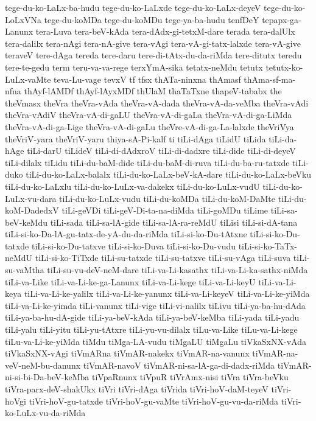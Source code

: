 {tege-du-ko-LaLx-ba-hudu
tege-du-ko-LaLxde
tege-du-ko-LaLx-deyeV
tege-du-ko-LoLxVNa
tege-du-koMDa
tege-du-koMDu
tege-ya-ba-hudu
tenfDeY
tepapx-ga-Lanunx
tera-Luva
tera-beV-kAda
tera-dAdx-gi-tetxM-dare
terada
tera-dalUlx
tera-dalilx
tera-nAgi
tera-nA-give
tera-vAgi
tera-vA-gi-tatx-lalxde
tera-vA-give
teraveV
tere-dAga
tereda
tere-daru
tere-di-tAtx-du-da-riMda
tere-ditutx
teredu
tere-te-gedu
term
teru-va-va-rege
terxYmA-sika
tetatx-neMdu
tetutx
tetutx-ko-LuLx-vaMte
teva-Lu-vage
tevxV
tf
tfsx
thATa-ninxna
thAmasf
thAma-sf-ma-nfna
thAyf-lAMDf
thAyf-lAyxMDf
thUlaM
thaTaTxne
thapeV-tababx
the
theVmasx
theVra
theVra-vAda
theVra-vA-dada
theVra-vA-da-veMba
theVra-vAdi
theVra-vAdiV
theVra-vA-di-gaLU
theVra-vA-di-gaLa
theVra-vA-di-ga-LiMda
theVra-vA-di-ga-Lige
theVra-vA-di-gaLu
theVre-vA-di-ga-La-lalxde
theVriVya
theVriV-yara
theVriV-yaru
thiya-sA-Pi-kalf
ti
tiLi-dAga
tiLidU
tiLida
tiLi-da-hAge
tiLi-darU
tiLideV
tiLi-di-dAdxroV
tiLi-di-dadxre
tiLi-dide
tiLi-di-deyeV
tiLi-dilalx
tiLidu
tiLi-du-baM-dide
tiLi-du-baM-di-ruva
tiLi-du-ba-ru-tatxde
tiLi-duko
tiLi-du-ko-LaLx-balalx
tiLi-du-ko-LaLx-beV-kA-dare
tiLi-du-ko-LaLx-beVku
tiLi-du-ko-LaLxlu
tiLi-du-ko-LuLx-va-dakekx
tiLi-du-ko-LuLx-vudU
tiLi-du-ko-LuLx-vu-dara
tiLi-du-ko-LuLx-vudu
tiLi-du-koMDa
tiLi-du-koM-DaMte
tiLi-du-koM-DadedxV
tiLi-geVDi
tiLi-geV-Di-ta-na-diMda
tiLi-goMDu
tiLime
tiLi-sa-beV-keMdu
tiLi-sada
tiLi-sa-lA-gide
tiLi-sa-lA-ra-reMdU
tiLisi
tiLi-si-dA-tana
tiLi-si-ko-Da-lA-gu-tatx-de-yA-du-da-riMda
tiLi-si-ko-Du-tAtxne
tiLi-si-ko-Du-tatxde
tiLi-si-ko-Du-tatxve
tiLi-si-ko-Duva
tiLi-si-ko-Du-vudu
tiLi-si-ko-TaTx-neMdU
tiLi-si-ko-TiTxde
tiLi-su-tatxde
tiLi-su-tatxve
tiLi-su-vAga
tiLi-suva
tiLi-su-vaMtha
tiLi-su-vu-deV-neM-dare
tiLi-va-Li-kasathx
tiLi-va-Li-ka-sathx-niMda
tiLi-va-Like
tiLi-va-Li-ke-ga-Lanunx
tiLi-va-Li-kege
tiLi-va-Li-keyU
tiLi-va-Li-keya
tiLi-va-Li-ke-yalilx
tiLi-va-Li-ke-yanunx
tiLi-va-Li-keyeV
tiLi-va-Li-ke-yiMda
tiLi-va-Li-ke-yimda
tiLi-vanunx
tiLi-vige
tiLi-vi-nalilx
tiLivu
tiLi-ya-ba-hu-dAda
tiLi-ya-ba-hu-dA-gide
tiLi-ya-beV-kAda
tiLi-ya-beV-keMba
tiLi-yada
tiLi-yadu
tiLi-yalu
tiLi-yitu
tiLi-yu-tAtxre
tiLi-yu-vu-dilalx
tiLu-va-Like
tiLu-va-Li-kege
tiLu-va-Li-ke-yiMda
tiMdu
tiMga-LA-vudu
tiMgaLU
tiMgaLu
tiVkaSxNX-vAda
tiVkaSxNX-vAgi
tiVmARna
tiVmAR-nakekx
tiVmAR-na-vanunx
tiVmAR-na-veV-neM-bu-danunx
tiVmAR-navoV
tiVmAR-ni-sa-lA-ga-di-dadx-riMda
tiVmAR-ni-si-bi-Da-beV-keMba
tiVpaRnunx
tiVpuR
tiVrAmx-nisi
tiVra
tiVra-beVku
tiVra-parx-deV-shakUkx
tiVri
tiVri-dAga
tiVrida
tiVri-hoV-daM-teyeV
tiVri-hoVgi
tiVri-hoV-gu-tatxde
tiVri-hoV-gu-vaMte
tiVri-hoV-gu-vu-da-riMda
tiVri-ko-LuLx-vu-da-riMda
}
